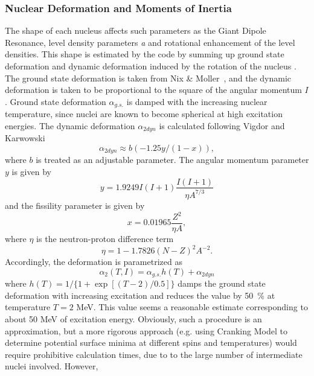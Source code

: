 \documentclass[twocolumn,amsmath,amssymb,10pt,groupedaddress,a4paper]{revtex4}
\begin{document}
\subsubsection{Nuclear Deformation and Moments of Inertia\label{sec: defor}}
The shape of each nucleus affects such parameters as the Giant Dipole
Resonance, level density parameters \emph{a} and rotational enhancement
of the level densities. This shape is estimated
by the code by summing up ground state deformation and dynamic deformation
induced by the rotation of the nucleus . The ground state deformation
is taken from Nix \& Moller~\cite{masses},
and the dynamic deformation is taken to be proportional to the square
of the angular momentum $I$. Ground state deformation $\alpha_{g.s.}$
is damped with the increasing nuclear temperature, since nuclei are
known to become spherical at high excitation energies. The dynamic
deformation $\alpha_{2dyn}$ is calculated following Vigdor and Karwowski
\cite{VK}
\begin{equation}
\alpha_{2dyn}\approx b(-1.25y/(1-x)),
\label{defor}
\end{equation}
\noindent where $b$ is treated as an adjustable parameter. The angular momentum
parameter $y$ is given by
\begin{equation}
y=1.9249I(I+1)\frac{I(I+1)}{\eta A^{7/3}}
\end{equation}
and the fissility parameter is given by
\begin{equation}
x=0.01965\frac{Z^{2}}{\eta A},
\end{equation}
\noindent where $\eta$ is the neutron-proton difference term
 \begin{equation}
\eta=1-1.7826(N-Z)^{2}A^{-2}.
\end{equation}
 Accordingly, the deformation is parametrized as
\begin{equation}
\alpha_{2}(T,I)=\alpha_{g.s.}h(T)+\alpha_{2dyn}
\label{totdefor}
\end{equation}
\noindent where $h(T)=1/\{1+\exp[(T-2)/0.5]\}$ damps the ground state
deformation with increasing excitation and reduces the value by 50~\%
at temperature $T=2$ MeV. This value seems a reasonable estimate
corresponding to about 50 MeV of excitation energy. Obviously, such
a procedure is an approximation, but a more rigorous approach (e.g.
using Cranking Model to determine potential surface minima at different
spins and temperatures) would require prohibitive calculation times,
due to to the large number of intermediate nuclei involved. However,
\end{document}
